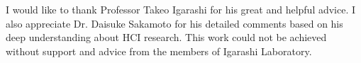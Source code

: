 I would like to thank Professor Takeo Igarashi for his great and helpful advice.
I also appreciate Dr. Daisuke Sakamoto for his detailed comments based on his deep understanding about HCI research.
This work could not be achieved without support and advice from the members of Igarashi Laboratory.
